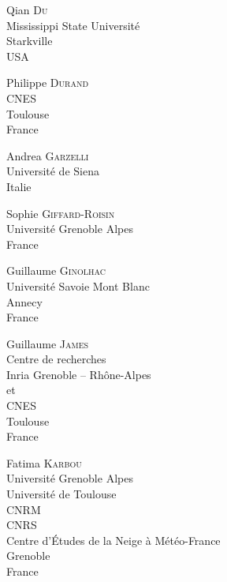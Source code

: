 \documentclass[main.tex]{subfiles}
\begin{document}
\begin{multicols}{2}
\begin{flushleft}
Qian \textsc{Du}\\Mississippi State Universit\'e\\Starkville\\USA\\[-4pt]
\end{flushleft}

\begin{flushleft}
Philippe \textsc{Durand}\\CNES\\Toulouse\\France\\[-4pt]
\end{flushleft}

\begin{flushleft}
Andrea \textsc{Garzelli}\\Universit\'e de Siena\\Italie\\[-4pt]
\end{flushleft}

\begin{flushleft}
Sophie \textsc{Giffard-Roisin}\\Universit\'{e} Grenoble Alpes\\France\\[-4pt]
\end{flushleft}

\begin{flushleft}
Guillaume \textsc{Ginolhac}\\Universit\'e Savoie Mont Blanc\\Annecy\\France\\[-4pt]
\end{flushleft}

\begin{flushleft}
Guillaume \textsc{James}\\
Centre de recherches\\
Inria Grenoble -- Rh\^{o}ne-Alpes\\
et\\
CNES\\
Toulouse\\
France\\[-10pt]
\end{flushleft}\eject

\begin{flushleft}
Fatima \textsc{Karbou}\\Universit\'{e} Grenoble Alpes\\
Universit\'e de Toulouse\\
CNRM\\
CNRS\\
Centre d'\'{E}tudes de la Neige \`a M\'{e}t\'{e}o-France\\
Grenoble\\
France\\
\end{flushleft}


\end{multicols}
\end{document}

